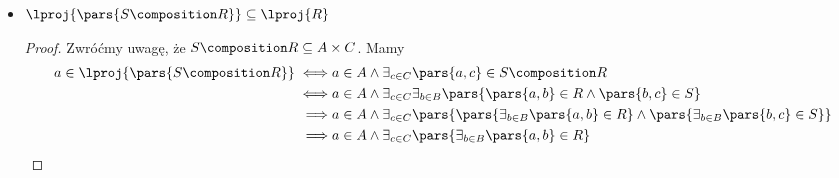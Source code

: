 \begin{description}
\begin{itemize}
\begin{proof}
\begin{equation*}
\begin{split}
                                \iff& \pars{a, b} \in \lproj{R} \times \rproj{R}
                        \end{split}
                    \end{equation*}
                    Pierwsze przejście jest tylko implikacją. Oczywiście jeśli \(\pars{a, b} \in R\), to możemy powiedzieć, że zarówno \(a\), jak i~\(b\) mają parę w~\(R\). Jednak z~samego faktu, że \(a\)~i~\(b\) mają parę w~\(R\), nie wynika jeszcze, że \(a\)~i~\(b\)~\emph{są} parą w~\(R\). Dlatego w~ogólnym przypadku mamy tu zaledwie inkluzję, a~nie równość, co łatwo zobaczyć na przykładzie:
                    \begin{align*}
                        A &= \set{a_0, a_1}\\
                        B &= \set{b_0, b_0}\\
                        R &= \set{\pars{a_0, b_0}, \pars{a_1, b_1}}\\
                        \lproj{R} &= \pars{a_0, a_1}\\
                        \rproj{R} &= \pars{b_0, b_1}\\
                        \lproj{R} \times \rproj{R} &= \set{\pars{a_0, b_0}, \pars{a_0, b_1}, \pars{a_1, b_0}, \pars{a_1, b_1}}\\
                        R &\subsetneq \lproj{R} \times \rproj{R}
                    \end{align*}
                \end{proof}
            \item \(\lproj{\pars{S \composition R}} \subseteq \lproj{R}\)
                \begin{proof}
                    Zwróćmy uwagę, że \(S \composition R \subseteq A \times C\). Mamy
                    \begin{equation*}
                        \begin{split}
                            a \in \lproj{\pars{S \composition R}}
                                \iff& a \in A \land \exists_{c \in C} \pars{a, c} \in S \composition R\\
                                \iff& a \in A \land \exists_{c \in C}\exists_{b \in B} \pars{\pars{a, b} \in R \land \pars{b, c} \in S}\\
                                \implies& a \in A \land \exists_{c \in C}\pars{\pars{\exists_{b \in B} \pars{a, b} \in R} \land \pars{\exists_{b \in B} \pars{b, c} \in S}}\\
                                \implies& a \in A \land \exists_{c \in C}\pars{\exists_{b \in B} \pars{a, b} \in R}\\

\end{split}
\end{equation*}
\end{proof}
\end{itemize}
\end{description}
